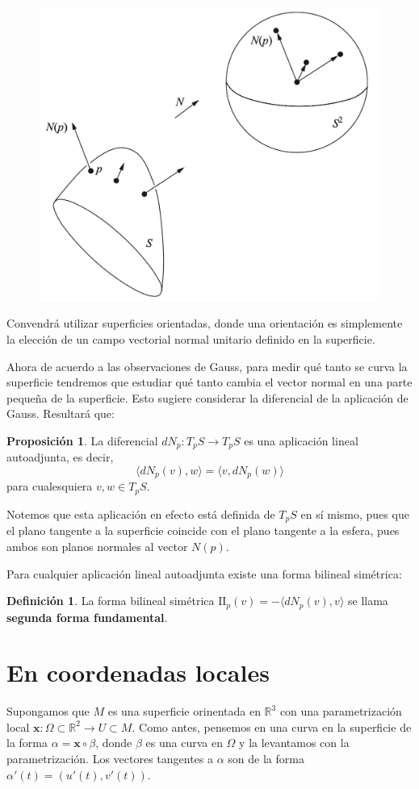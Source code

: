 \documentclass[spanish]{book}
\theoremstyle{definition}
\newtheorem*{defn}{Definición}
\newtheorem*{prop}{Proposición}
\begin{document}
\begin{figure}
	\centering
	\includegraphics[width=0.7\linewidth]{gauss1}
\end{figure}
Convendrá utilizar superficies orientadas, donde una orientación es simplemente la elección de un campo vectorial normal unitario definido en la superficie.

Ahora de acuerdo a las observaciones de Gauss, para medir qué tanto se curva la superficie tendremos que estudiar qué tanto cambia el vector normal en una parte pequeña de la superficie. Esto sugiere considerar la diferencial de la aplicación de Gauss. Resultará que:
\begin{prop}
	La diferencial $dN_p:T_pS\to T_pS$ es una aplicación lineal autoadjunta, es decir,
	\[\langle dN_p(v),w\rangle=\langle v,dN_p(w)\rangle\]
	para cualesquiera $v,w\in T_pS$.
\end{prop}

Notemos que esta aplicación en efecto está definida de $T_pS$ en sí mismo, pues que el plano tangente a la superficie coincide con el plano tangente a la esfera, pues ambos son planos normales al vector $N(p)$.

Para cualquier aplicación lineal autoadjunta existe una forma bilineal simétrica:
\begin{defn}
	 La forma bilineal simétrica $\mathrm{I\!I}_p(v)=-\langle dN_p(v),v\rangle$ se llama \textbf{segunda forma fundamental}.
\end{defn}
\section{En coordenadas locales}
Supongamos que $M$ es una superficie orinentada en $\mathbb{R}^3$ con una parametrización local $\mathbf{x}:\Omega\subset\mathbb{R}^2\to U\subset M. $ Como antes, pensemos en una curva en la superficie de la forma $\alpha=\mathbf{x}\circ\beta$, donde $\beta$ es una curva en $\Omega$ y la levantamos con la parametrización. Los vectores tangentes a $\alpha$ son de la forma $\alpha'(t)=(u'(t),v'(t))$.
\end{document}
